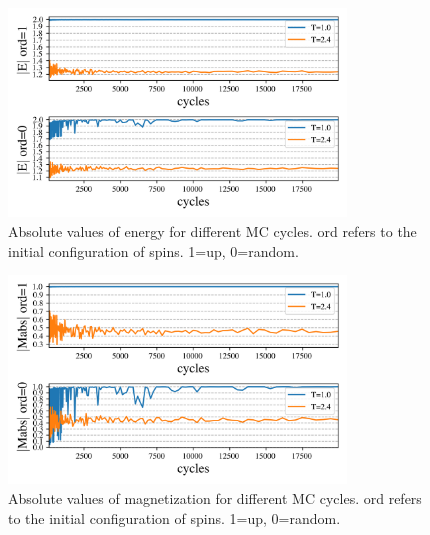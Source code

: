 \begin{figure}[H]
  \centering
  \includegraphics[width=0.8\textwidth]{../figures/equilibrium_E.png}
  \caption{Absolute values of energy for different MC cycles.
  ord refers to the initial configuration of spins. 1=up, 0=random.}
  \label{fig:equi_E}
\end{figure}


\begin{figure}[H]
  \centering
  \includegraphics[width=0.8\textwidth]{../figures/equilibrium_Mabs.png}
  \caption{Absolute values of magnetization for different MC cycles.
  ord refers to the initial configuration of spins. 1=up, 0=random.}
  \label{fig:equi_M}
\end{figure}




